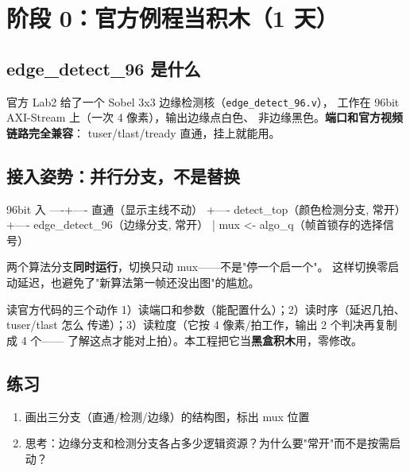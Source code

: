 \documentclass[11pt]{ctexart}
\newcommand{\code}[1]{\texttt{#1}}
\begin{document}
\section{阶段 0：官方例程当积木（1 天）}

\subsection{edge\_detect\_96 是什么}

官方 Lab2 给了一个 Sobel 3x3 边缘检测核（\code{edge\_detect\_96.v}），
工作在 96bit AXI-Stream 上（一次 4 像素），输出边缘点白色、
非边缘黑色。\textbf{端口和官方视频链路完全兼容}：
tuser/tlast/tready 直通，挂上就能用。

\subsection{接入姿势：并行分支，不是替换}

\begin{Verilog}
96bit 入 ----+---- 直通（显示主线不动）
             +---- detect_top（颜色检测分支, 常开）
             +---- edge_detect_96（边缘分支, 常开）
                        |
             mux <- algo_q（帧首锁存的选择信号）
\end{Verilog}

两个算法分支\textbf{同时运行}，切换只动 mux——不是"停一个启一个"。
这样切换零启动延迟，也避免了"新算法第一帧还没出图"的尴尬。

\begin{keybox}{读官方代码的三个动作}
1）读端口和参数（能配置什么）；2）读时序（延迟几拍、tuser/tlast 怎么
传递）；3）读粒度（它按 4 像素/拍工作，输出 2 个判决再复制成 4 个——
了解这点才能对上拍）。本工程把它当\textbf{黑盒积木}用，零修改。
\end{keybox}

\subsection{练习}

\begin{enumerate}
  \item 画出三分支（直通/检测/边缘）的结构图，标出 mux 位置
  \item 思考：边缘分支和检测分支各占多少逻辑资源？为什么要"常开"而不是按需启动？
\end{enumerate}

\end{document}
